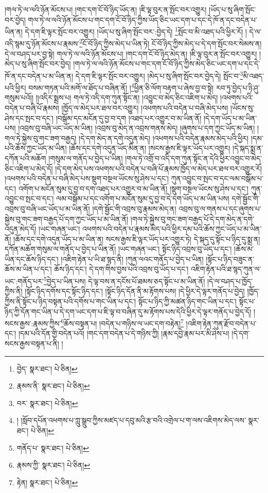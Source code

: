 །གལ་ཏེ་ལ་ལའི་ཉོན་མོངས་པ། །གང་དག་ངོ་བོ་ཉིད་ཡོད་ན། །ཇི་ལྟ་བུར་ན་སྤོང་བར་འགྱུར། །ཡོད་པ་སུ་ཞིག་སྤོང་བར་བྱེད། གལ་ཏེ་ལ་ལའི་ཉོན་མོངས་པ་གང་དག་ངོ་བོ་ཉིད་ཀྱིས་ཡོད་ཅིང་ཡང་དག་པ་དང་དེ་ཁོ་ན་དང་བདེན་པ་ཡིན་ན། དེ་དག་ཇི་ལྟར་སྤོང་བར་འགྱུར། །ཡོད་པ་སུ་ཞིག་སྤོང་བར་:བྱེད་དེ། \footnote{བྱེད་  སྣར་ཐང་།  པེ་ཅིན། }སྤོང་བ་མི་འཐད་པའི་ཕྱིར་རོ། །
དེ་ལ་འདི་སྙམ་དུ་ཉོན་མོངས་པ་རྣམས་\footnote{རྣམས་ནི་  སྣར་ཐང་།  པེ་ཅིན། }ངོ་བོ་ཉིད་ཀྱིས་མེད་པ་ཡིན་ཏེ། ངོ་བོ་ཉིད་ཀྱིས་མེད་པ་དེ་དག་སྤོང་བར་སེམས་ན། དེ་ལ་བཤད་པར་བྱ་སྟེ། གལ་ཏེ་ལ་ལའི་ཉོན་མོངས་པ། །གང་དག་ངོ་བོ་ཉིད་མེད་ན། །ཇི་ལྟ་བུར་ན་སྤོང་བར་འགྱུར། །མེད་པ་སུ་ཞིག་སྤོང་བར་བྱེད། །གལ་ཏེ་ལ་ལའི་ཉོན་མོངས་པ་གང་དག་ངོ་བོ་ཉིད་ཀྱིས་མེད་ཅིང་ཡང་དག་པ་དང་དེ་ཁོ་ན་དང་བདེན་པ་མ་ཡིན་ན། དེ་དག་ཇི་ལྟར་སྤོང་བར་འགྱུར། །མེད་པ་སུ་ཞིག་སྤོང་བར་བྱེད་དེ། སྤོང་བ་\footnote{བར་  སྣར་ཐང་།  པེ་ཅིན། }མི་འཐད་པའི་ཕྱིར། བསམ་གཏན་པའི་མགོ་ལ་ཐོད་པ་བཞིན་ནོ། །\footnote{། །སློབ་དཔོན་འཕགས་པ་ཀླུ་སྒྲུབ་ཀྱིས་མཛད་པ་དབུ་མའི་རྩ་བའི་འགྲེལ་པ་ག་ལས་འཇིགས་མེད་ལས་  སྣར་ཐང་།  པེ་ཅིན། }ཕྱིན་ཅི་ལོག་བརྟག་པ་ཞེས་བྱ་བ་སྟེ། རབ་ཏུ་བྱེད་པ་ཉི་ཤུ་གསུམ་པའོ།། །།འདིར་སྨྲས་པ། གལ་ཏེ་འདི་དག་ཀུན་སྟོང་ན། །འབྱུང་བ་མེད་ཅིང་འཇིག་པ་མེད། །འཕགས་པའི་བདེན་པ་བཞི་པོ་རྣམས། །ཁྱོད་ལ་མེད་པར་ཐལ་བར་འགྱུར། །འཕགས་པའི་བདེན་པ་བཞི་མེད་པས། །ཡོངས་སུ་ཤེས་དང་སྤང་བ་དང་། །བསྒོམ་དང་མངོན་དུ་བྱ་བ་དག །འཐད་པར་འགྱུར་བ་མ་ཡིན་ནོ། །དེ་དག་ཡོད་པ་མ་ཡིན་པས། །འབྲས་བུ་བཞི་ཡང་ཡོད་མ་ཡིན། །འབྲས་བུ་མེད་ན་འབྲས་གནས་མེད། །ཞུགས་པ་དག་ཀྱང་ཡོད་མ་ཡིན། །གལ་ཏེ་སྐྱེས་བུ་གང་ཟག་བརྒྱད། །དེ་དག་མེད་ན་དགེ་འདུན་མེད། །འཕགས་པའི་བདེན་རྣམས་མེད་པའི་ཕྱིར། །དམ་པའི་ཆོས་ཀྱང་ཡོད་མ་ཡིན། །ཆོས་དང་དགེ་འདུན་ཡོད་མིན་ན། །སངས་རྒྱས་ཇི་ལྟར་ཡོད་པར་འགྱུར། །དེ་སྐད་སྨྲ་ན་དཀོན་པའི་མཆོག །གསུམ་ལ་གནོད་པ་བྱེད་པ་ཡིན། །གལ་ཏེ་འགྲོ་བ་འདི་དག་ཀུན་སྟོང་ན་དེའི་ཕྱིར་འབྱུང་བ་མེད་ཅིང་འཇིག་པ་མེད་དོ། །དེ་དག་མེད་པས་འཕགས་པའི་བདེན་པ་བཞི་པོ་རྣམས་ཁྱོད་ལ་མེད་པར་ཐལ་བར་འགྱུར་རོ། །འཕགས་པའི་བདེན་པ་བཞི་མེད་པས་སྡུག་བསྔལ་ཡོངས་སུ་ཤེས་པ་དང་། ཀུན་འབྱུང་བ་སྤང་བ་དང་ལམ་བསྒོམ་པ་དང་། འགོག་པ་མངོན་སུམ་དུ་བྱ་བ་དག་འཐད་པར་འགྱུར་བ་མ་ཡིན་ནོ། །སྡུག་བསྔལ་ཡོངས་སུ་ཤེས་པ་དང་། ཀུན་འབྱུང་བ་སྤང་བ་དང་། ལམ་བསྒོམ་པ་དང་འགོག་པ་མངོན་སུམ་དུ་བྱ་བ་དེ་དག་ཡོད་པ་མ་ཡིན་པས། དགེ་སྦྱོང་གི་འབྲས་བུ་བཞི་ཡང་ཡོད་པ་མ་ཡིན་ནོ། །དགེ་སྦྱོང་གི་འབྲས་བུ་རྣམས་མེད་ན། འབྲས་བུ་ལ་གནས་པ་དང་ཞུགས་པ་སྐྱེས་བུ་གང་ཟག་བརྒྱད་པོ་དག་ཀྱང་ཡོད་པ་མ་ཡིན་ནོ། །གལ་ཏེ་སྐྱེས་བུ་གང་ཟག་བརྒྱད་པོ་དེ་དག་མེད་ན་དགེ་འདུན་མེད་དོ། །ཡང་གཞན་ཡང་། འཕགས་པའི་བདེན་པ་རྣམས་མེད་པའི་ཕྱིར་དམ་པའི་ཆོས་ཀྱང་ཡོད་པ་མ་ཡིན་ནོ། །ཆོས་དང་དགེ་འདུན་ཡོད་པ་མ་ཡིན་ན། སངས་རྒྱས་ཇི་ལྟར་ཡོད་པར་འགྱུར་ཏེ། དེ་སྐད་དུ་སྟོང་པ་ཉིད་དུ་སྨྲ་ན། དཀོན་མཆོག་གསུམ་ལ་གནོད་པ་བྱེད་པ་ཡིན་ནོ། །ཡང་གཞན་ཡང་། སྟོང་ཉིད་འབྲས་བུ་ཡོད་པ་དང་། །ཆོས་མ་ཡིན་དང་ཆོས་ཉིད་དང་། །འཇིག་རྟེན་པ་ཡི་ཐ་སྙད་ནི། །ཀུན་ལའང་གནོད་པ་བྱེད་པ་ཡིན། །སྟོང་པ་ཉིད་བཟུང་ན་ཆོས་མ་ཡིན་པ་དང་། ཆོས་ཉིད་དང་། དེ་དག་གིས་བྱས་པའི་འབྲས་བུ་ཡོད་པ་དང་། འཇིག་རྟེན་པའི་ཐ་སྙད་ཀུན་ལ་ཡང་:གནོད་པར་\footnote{གནོད་པ་  སྣར་ཐང་།  པེ་ཅིན། }བྱེད་པ་ཡིན་པས། དེ་ལྟ་བས་ན་དངོས་པོ་ཐམས་ཅད་སྟོང་པ་མ་ཡིན་ནོ། །དེ་ལ་བཤད་པ་ཁྱོད་ཀྱིས་ནི། །སྟོང་ཉིད་དགོས་དང་སྟོང་ཉིད་དང་། །སྟོང་ཉིད་དོན་ནི་མ་རྟོགས་པས། །དེ་ཕྱིར་དེ་ལྟར་གནོད་པ་བྱེད། །ཁྱོད་ཀྱིས་ནི་སྟོང་པ་ཉིད་བསྟན་པའི་དགོས་པ་གང་ཡིན་པ་དང་། སྟོང་པ་ཉིད་ཀྱི་མཚན་ཉིད་གང་ཡིན་པ་དང་། སྟོང་པ་ཉིད་ཀྱི་དོན་གང་ཡིན་པ་དེ་དག་ཡང་དག་པ་ཇི་ལྟ་བ་བཞིན་དུ་མ་རྟོགས་པས་དེའི་ཕྱིར་དེ་ལྟར་གནོད་པ་བྱེད་དོ། །སངས་རྒྱས་:རྣམས་ཀྱིས་\footnote{རྣམས་ཀྱི་  སྣར་ཐང་།  པེ་ཅིན། }ཆོས་བསྟན་པ། །བདེན་པ་གཉིས་ལ་ཡང་དག་བརྟེན།\footnote{རྟེན།  སྣར་ཐང་།  པེ་ཅིན། } །འཇིག་རྟེན་ཀུན་རྫོབ་བདེན་པ་དང་། །དམ་པའི་དོན་གྱི་བདེན་པའོ། །གང་དག་བདེན་པ་དེ་གཉིས་ཀྱི། །རྣམ་དབྱེ་རྣམ་པར་མི་ཤེས་པ། །དེ་དག་སངས་རྒྱས་བསྟན་པ་ནི། །
